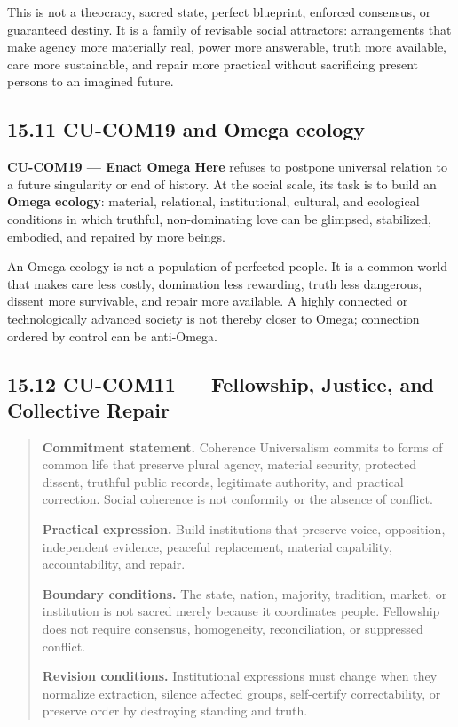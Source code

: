 \documentclass[
  11pt,
]{article}
\begin{document}
This is not a theocracy, sacred state, perfect blueprint, enforced
consensus, or guaranteed destiny. It is a family of revisable social
attractors: arrangements that make agency more materially real, power
more answerable, truth more available, care more sustainable, and repair
more practical without sacrificing present persons to an imagined
future.

\subsection{15.11 CU-COM19 and Omega
ecology}\label{cu-com19-and-omega-ecology}

\textbf{CU-COM19 --- Enact Omega Here} refuses to postpone universal
relation to a future singularity or end of history. At the social scale,
its task is to build an \textbf{Omega ecology}: material, relational,
institutional, cultural, and ecological conditions in which truthful,
non-dominating love can be glimpsed, stabilized, embodied, and repaired
by more beings.

An Omega ecology is not a population of perfected people. It is a common
world that makes care less costly, domination less rewarding, truth less
dangerous, dissent more survivable, and repair more available. A highly
connected or technologically advanced society is not thereby closer to
Omega; connection ordered by control can be anti-Omega.

\subsection{15.12 CU-COM11 --- Fellowship, Justice, and Collective
Repair}\label{cu-com11-fellowship-justice-and-collective-repair}

\begin{quote}
\textbf{Commitment statement.} Coherence Universalism commits to forms
of common life that preserve plural agency, material security, protected
dissent, truthful public records, legitimate authority, and practical
correction. Social coherence is not conformity or the absence of
conflict.

\textbf{Practical expression.} Build institutions that preserve voice,
opposition, independent evidence, peaceful replacement, material
capability, accountability, and repair.

\textbf{Boundary conditions.} The state, nation, majority, tradition,
market, or institution is not sacred merely because it coordinates
people. Fellowship does not require consensus, homogeneity,
reconciliation, or suppressed conflict.

\textbf{Revision conditions.} Institutional expressions must change when
they normalize extraction, silence affected groups, self-certify
correctability, or preserve order by destroying standing and truth.
\end{quote}
\end{document}
